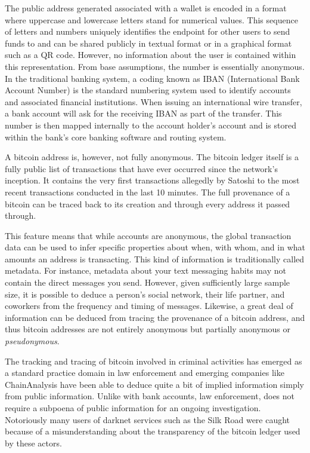 The public address generated associated with a wallet is encoded in a format
where uppercase and lowercase letters stand for numerical values. This sequence
of letters and numbers uniquely identifies the endpoint for other users to send
funds to and can be shared publicly in textual format or in a graphical format
such as a QR code. However, no information about the user is contained within
this representation. From base assumptions, the number is essentially anonymous.
In the traditional banking system, a coding known as IBAN (International Bank
Account Number) is the standard numbering system used to identify accounts and
associated financial institutions. When issuing an international wire transfer,
a bank account will ask for the receiving IBAN as part of the transfer. This
number is then mapped internally to the account holder's account and is stored
within the bank's core banking software and routing system.

A bitcoin address is, however, not fully anonymous. The bitcoin ledger itself is
a fully public list of transactions that have ever occurred since the network's
inception. It contains the very first transactions allegedly by Satoshi to the
most recent transactions conducted in the last 10 minutes. The full provenance
of a bitcoin can be traced back to its creation and through every address it
passed through.

This feature means that while accounts are anonymous, the global transaction
data can be used to infer specific properties about when, with whom, and in what
amounts an address is transacting. This kind of information is traditionally
called metadata. For instance, metadata about your text messaging habits may not
contain the direct messages you send. However, given sufficiently large sample
size, it is possible to deduce a person's social network, their life partner,
and coworkers from the frequency and timing of messages. Likewise, a great deal
of information can be deduced from tracing the provenance of a bitcoin address,
and thus bitcoin addresses are not entirely anonymous but partially anonymous or
\textit{pseudonymous}.


The tracking and tracing of bitcoin involved in criminal activities has emerged
as a standard practice domain in law enforcement and emerging companies like
ChainAnalysis have been able to deduce quite a bit of implied information simply
from public information. Unlike with bank accounts, law enforcement, does not
require a subpoena of public information for an ongoing investigation.
Notoriously many users of darknet services such as the Silk Road were caught
because of a misunderstanding about the transparency of the bitcoin ledger used
by these actors.


